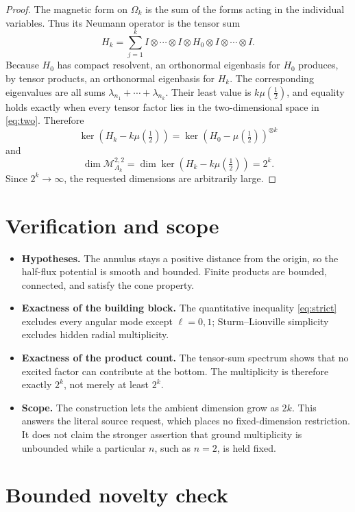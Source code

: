 \documentclass[11pt]{article}
\newcommand{\cM}{\mathcal M}
\begin{document}
\begin{proof}
The magnetic form on \(\Omega_k\) is the sum of the forms acting in the
individual variables.  Thus its Neumann operator is the tensor sum
\[
 H_k=\sum_{j=1}^k
 I\otimes\cdots\otimes I\otimes H_0\otimes
 I\otimes\cdots\otimes I.
\]
Because \(H_0\) has compact resolvent, an orthonormal eigenbasis for \(H_0\)
produces, by tensor products, an orthonormal eigenbasis for \(H_k\).
The corresponding eigenvalues are all sums
\(\lambda_{n_1}+\cdots+\lambda_{n_k}\).  Their least value is
\(k\mu(\tfrac12)\), and equality holds exactly when every tensor factor
lies in the two-dimensional space in \eqref{eq:two}.  Therefore
\[
 \ker\!\left(H_k-k\mu(\tfrac12)\right)
   =\ker(H_0-\mu(\tfrac12))^{\otimes k}
\]
and
\[
             \dim\cM_{A_k}^{2,2}
             =\dim\ker\!\left(H_k-k\mu(\tfrac12)\right)
             =2^k.
\]
Since \(2^k\to\infty\), the requested dimensions are arbitrarily large.
\end{proof}

\section{Verification and scope}

\begin{itemize}
\item \textbf{Hypotheses.}  The annulus stays a positive distance from the
origin, so the half-flux potential is smooth and bounded.  Finite products
are bounded, connected, and satisfy the cone property.
\item \textbf{Exactness of the building block.}  The quantitative inequality
\eqref{eq:strict} excludes every angular mode except \(\ell=0,1\);
Sturm--Liouville simplicity excludes hidden radial multiplicity.
\item \textbf{Exactness of the product count.}  The tensor-sum spectrum shows
that no excited factor can contribute at the bottom.  The multiplicity is
therefore exactly \(2^k\), not merely at least \(2^k\).
\item \textbf{Scope.}  The construction lets the ambient dimension grow as
\(2k\).  This answers the literal source request, which places no
fixed-dimension restriction.  It does not claim the stronger assertion that
ground multiplicity is unbounded while a particular \(n\), such as \(n=2\),
is held fixed.
\end{itemize}

\section{Bounded novelty check}
\end{document}
